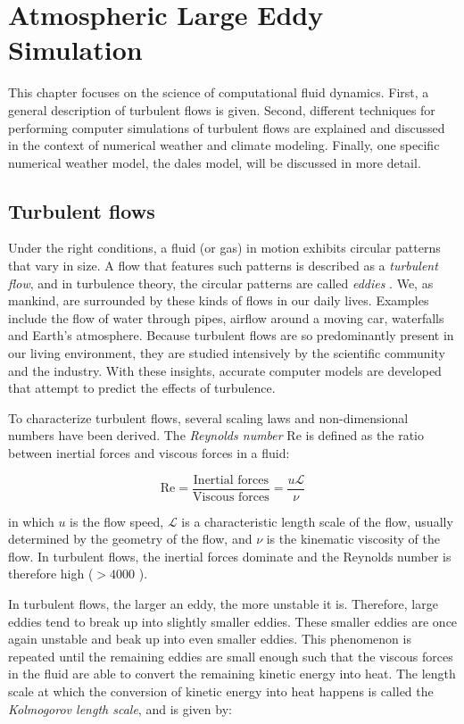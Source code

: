 \chapter{Atmospheric Large Eddy Simulation} \label{chap:les}
This chapter focuses on the science of computational fluid dynamics. First, a general description of turbulent flows is given. Second, different techniques for performing computer simulations of turbulent flows are explained and discussed in the context of numerical weather and climate modeling. Finally, one specific numerical weather model, the \acrfull{dales} model, will be discussed in more detail.

\section{Turbulent flows}
Under the right conditions, a fluid (or gas) in motion exhibits circular patterns that vary in size. A flow that features such patterns is described as a \emph{turbulent flow}, and in turbulence theory, the circular patterns are called \emph{eddies} \citep{popeTurbulentFlows2000}. We, as mankind, are surrounded by these kinds of flows in our daily lives. Examples include the flow of water through pipes, airflow around a moving car, waterfalls and Earth's atmosphere. Because turbulent flows are so predominantly present in our living environment, they are studied intensively by the scientific community and the industry. With these insights, accurate computer models are developed that attempt to predict the effects of turbulence.

To characterize turbulent flows, several scaling laws and non-dimensional numbers have been derived. The \emph{Reynolds number} $\text{Re}$ is defined as the ratio between inertial forces and viscous forces in a fluid: 

\begin{equation}
    \text{Re} = \frac{\text{Inertial forces}}{\text{Viscous forces}} = \frac{u \mathcal{L}}{\nu}
    \label{eq:reynolds_number}
\end{equation}

in which $u$ is the flow speed, $\mathcal{L}$ is a characteristic length scale of the flow, usually determined by the geometry of the flow, and $\nu$ is the kinematic viscosity of the flow. In turbulent flows, the inertial forces dominate and the Reynolds number is therefore high ($>4000$ \citep{popeTurbulentFlows2000}). 

In turbulent flows, the larger an eddy, the more unstable it is. Therefore, large eddies tend to break up into slightly smaller eddies. These smaller eddies are once again unstable and beak up into even smaller eddies. This phenomenon is repeated until the remaining eddies are small enough such that the viscous forces in the fluid are able to convert the remaining kinetic energy into heat. The length scale at which the conversion of kinetic energy into heat happens is called the \emph{Kolmogorov length scale}, and is given by:

